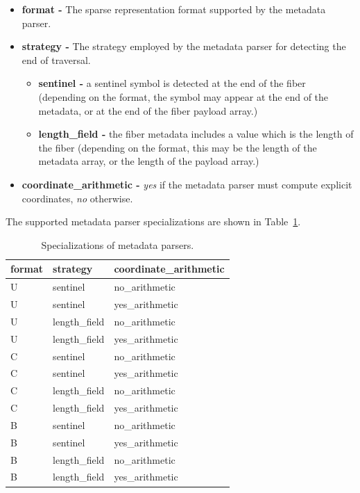 \begin{itemize}
    \item \textbf{format -} The sparse representation format supported by the metadata parser.
    \item \textbf{strategy -} The strategy employed by the metadata parser for detecting the end of traversal.
    \begin{itemize}
        \item \textbf{sentinel -} a sentinel symbol is detected at the end of the fiber (depending on the format, the symbol may appear at the end of the metadata, or at the end of the fiber payload array.)
        \item \textbf{length\_field -} the fiber metadata includes a value which is the length of the fiber (depending on the format, this may be the length of the metadata array, or the length of the payload array.)
    \end{itemize}
    \item \textbf{coordinate\_arithmetic -} \textit{yes} if the metadata parser must compute explicit coordinates, \textit{no} otherwise.
\end{itemize}

The supported metadata parser specializations are shown in Table~\ref{tab:MetadataParser_specializations}.

\begin{table}[H]
\centering
\begin{tabular}{lll}
\toprule
 format   & strategy       & coordinate\_arithmetic   \\
\midrule
 U        & sentinel & no\_arithmetic                \\
 U        & sentinel & yes\_arithmetic                 \\
 U        & length\_field & no\_arithmetic              \\
 U        & length\_field & yes\_arithmetic             \\
 C        & sentinel & no\_arithmetic                \\
 C        & sentinel & yes\_arithmetic                 \\
 C        & length\_field & no\_arithmetic              \\
 C        & length\_field & yes\_arithmetic             \\
 B        & sentinel & no\_arithmetic                  \\
 B        & sentinel & yes\_arithmetic                 \\
 B        & length\_field & no\_arithmetic              \\
 B        & length\_field & yes\_arithmetic             \\
\bottomrule
\end{tabular}
\caption{Specializations of metadata parsers.}
\label{tab:MetadataParser_specializations}
\end{table}

